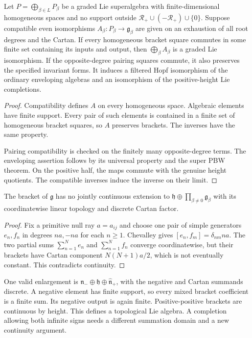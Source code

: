 \begin{theorem}
\label{thm:bkm-finite-operation-reconstruction}
Let $P=\bigoplus_{\beta\in L}P_\beta$ be a graded Lie superalgebra
with finite-dimensional homogeneous spaces and no support outside
$\mathcal R_+\cup(-\mathcal R_+)\cup\{0\}$. Suppose compatible
even isomorphisms $A_\beta:P_\beta\to\mathfrak g_\beta$ are given
on an exhaustion of all root degrees and the Cartan. If every
homogeneous bracket square commutes in some finite set containing
its inputs and output, then $\bigoplus_\beta A_\beta$ is a graded
Lie isomorphism. If the opposite-degree pairing squares commute,
it also preserves the specified invariant forms. It induces a
filtered Hopf isomorphism of the ordinary enveloping algebras and
an isomorphism of the positive-height Lie completions.
\end{theorem}
\begin{proof}
Compatibility defines $A$ on every homogeneous space. Algebraic
elements have finite support. Every pair of such elements is
contained in a finite set of homogeneous bracket squares, so $A$
preserves brackets. The inverses have the same property.

Pairing
compatibility is checked on the finitely many opposite-degree
terms. The enveloping assertion follows by its universal property
and the super PBW theorem. On the positive half, the maps commute
with the genuine height quotients. The compatible inverses induce
the inverse on their limit.
\end{proof}

\begin{proposition}
\label{prop:bkm-two-sided-completion-obstruction}
The bracket of $\mathfrak g$ has no jointly continuous extension
to $\mathfrak h\oplus\prod_{\beta\ne0}\mathfrak g_\beta$ with
its coordinatewise linear topology and discrete Cartan factor.
\end{proposition}
\begin{proof}
Fix a primitive null ray $a=a_{ij}$ and choose one pair of simple
generators $e_n,f_n$ in degrees $na,-na$ for each $n\geq1$.
Chevalley gives $[e_n,f_m]=\delta_{nm}na$.
The two partial sums $\sum_{n=1}^Ne_n$ and $\sum_{n=1}^Nf_n$
converge coordinatewise, but their brackets have Cartan component
$N(N+1)a/2$, which is not eventually constant. This contradicts
continuity.
\end{proof}

One valid enlargement is
$\mathfrak n_-\oplus\mathfrak h\oplus\widehat{\mathfrak n}_+$,
with the negative and Cartan summands discrete. A negative element
has finite support, so every mixed bracket coefficient is a finite
sum. Its negative output is again finite. Positive-positive
brackets are continuous by height. This defines a topological Lie
algebra. A completion allowing both infinite signs needs a
different summation domain and a new continuity argument.

